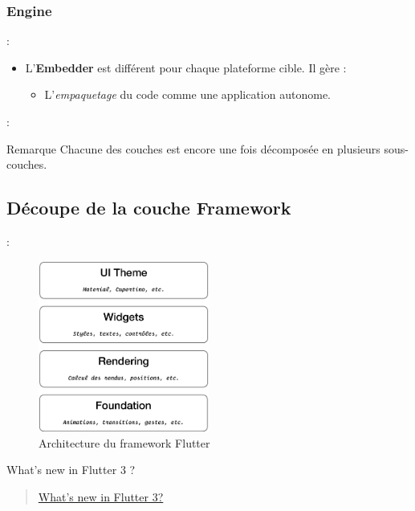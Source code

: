 \documentclass[10pt]{beamer}
\begin{document}
\subsubsection{Engine}
\begin{frame}[fragile,t]{\secname : \subsecname}
    \begin{itemize}
        \item L'\textbf{Embedder} est différent pour chaque plateforme cible. Il gère :
              \begin{itemize}
                  \item L'\textit{empaquetage} du code comme une application autonome.
              \end{itemize}
    \end{itemize}
\end{frame}

\begin{frame}[fragile,t]{\secname : \subsecname}
    \begin{block}{Remarque}
        Chacune des couches est encore une fois décomposée en plusieurs sous-couches.
    \end{block}
\end{frame}

\subsection{Découpe de la couche Framework}
\begin{frame}[fragile,t]{\secname : \subsecname}
    \begin{figure}[H]
        \begin{center}
            \includegraphics[width=0.5\textwidth]{../assets/img/architecture-framework.eps}
            \caption*{Architecture du framework Flutter}
            \label{Fig:architecture-framework}
        \end{center}
    \end{figure}
\end{frame}

\begin{frame}[fragile]{What’s new in Flutter 3 ?}
    \begin{quote}
        \href{https://medium.com/flutter/whats-new-in-flutter-3-8c74a5bc32d0}{What’s new in Flutter 3?}
    \end{quote}
\end{frame}
\end{document}
